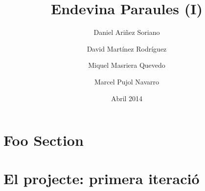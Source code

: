 \documentclass[a4paper]{scrartcl}
\title{Endevina Paraules (I)}
\date{Abril 2014}
\author{Daniel Ariñez Soriano}
\author{David Martínez Rodríguez}
\author{Miquel Masriera Quevedo}
\author{Marcel Pujol Navarro\vspace{11cm}}
\affil{Arquitectura del Software\\Facultat d'Informàtica de Barcelona, UPC}
\begin{document}
	
	\maketitle
	\newpage
	\tableofcontents %
	\cleardoublepage

\section{Foo Section} 


\section{El projecte: primera iteració}


\nocite{*}


\end{document}
